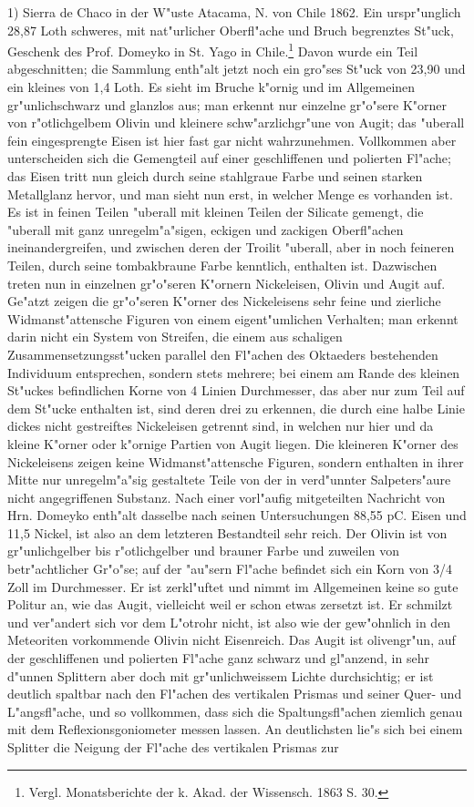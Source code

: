 \documentclass[a4paper, 11pt, oneside, german]{article}
\begin{document}
1) Sierra de Chaco in der W"uste Atacama, N. von Chile 1862. Ein urspr"unglich 28,87 Loth schweres, mit nat"urlicher Oberfl"ache und Bruch begrenztes St"uck, Geschenk des Prof. Domeyko in St. Yago in Chile.\footnote{Vergl. Monatsberichte der k. Akad. der Wissensch. 1863 S. 30.} Davon wurde ein Teil abgeschnitten; die Sammlung enth"alt jetzt noch ein gro"ses St"uck von 23,90 und ein kleines von 1,4 Loth. Es sieht im Bruche k"ornig und im Allgemeinen gr"unlichschwarz und glanzlos aus; man erkennt nur einzelne gr"o"sere K"orner von r"otlichgelbem Olivin und kleinere schw"arzlichgr"une von Augit; das "uberall fein eingesprengte Eisen ist hier fast gar nicht wahrzunehmen. Vollkommen aber unterscheiden sich die Gemengteil auf einer geschliffenen und polierten Fl"ache; das Eisen tritt nun gleich durch seine stahlgraue Farbe und seinen starken Metallglanz hervor, und man sieht nun erst, in welcher Menge es vorhanden ist. Es ist in feinen Teilen "uberall mit kleinen Teilen der Silicate gemengt, die "uberall mit ganz unregelm"a"sigen, eckigen und zackigen Oberfl"achen ineinandergreifen, und zwischen deren der Troilit "uberall, aber in noch feineren Teilen, durch seine tombakbraune Farbe kenntlich, enthalten ist. Dazwischen treten nun in einzelnen gr"o"seren K"ornern Nickeleisen, Olivin und Augit auf. Ge"atzt zeigen die gr"o"seren K"orner des Nickeleisens sehr feine und zierliche Widmanst"attensche Figuren von einem eigent"umlichen Verhalten; man erkennt darin nicht ein System von Streifen, die einem aus schaligen Zusammensetzungsst"ucken parallel den Fl"achen des Oktaeders bestehenden Individuum entsprechen, sondern stets mehrere; bei einem am Rande des kleinen St"uckes befindlichen Korne von 4 Linien Durchmesser, das aber nur zum Teil auf dem St"ucke enthalten ist, sind deren drei zu erkennen, die durch eine halbe Linie dickes nicht gestreiftes Nickeleisen getrennt sind, in welchen nur hier und da kleine K"orner oder k"ornige Partien von Augit liegen. Die kleineren K"orner des Nickeleisens zeigen keine Widmanst"attensche Figuren, sondern enthalten in ihrer Mitte nur unregelm"a"sig gestaltete Teile von der in verd"unnter Salpeters"aure nicht angegriffenen Substanz. Nach einer vorl"aufig mitgeteilten Nachricht von Hrn. Domeyko enth"alt dasselbe nach seinen Untersuchungen 88,55 pC. Eisen und 11,5 Nickel, ist also an dem letzteren Bestandteil sehr reich. Der Olivin ist von gr"unlichgelber bis r"otlichgelber und brauner Farbe und zuweilen von betr"achtlicher Gr"o"se; auf der "au"sern Fl"ache befindet sich ein Korn von 3/4 Zoll im Durchmesser. Er ist zerkl"uftet und nimmt im Allgemeinen keine so gute Politur an, wie das Augit, vielleicht weil er schon etwas zersetzt ist. Er schmilzt und ver"andert sich vor dem L"otrohr nicht, ist also wie der gew"ohnlich in den Meteoriten vorkommende Olivin nicht Eisenreich. Das Augit ist olivengr"un, auf der geschliffenen und polierten Fl"ache ganz schwarz und gl"anzend, in sehr d"unnen Splittern aber doch mit gr"unlichweissem Lichte durchsichtig; er ist deutlich spaltbar nach den Fl"achen des vertikalen Prismas und seiner Quer- und L"angsfl"ache, und so vollkommen, dass sich die Spaltungsfl"achen ziemlich genau mit dem Reflexionsgoniometer messen lassen. An deutlichsten lie"s sich bei einem Splitter die Neigung der Fl"ache des vertikalen Prismas zur 
\end{document}
